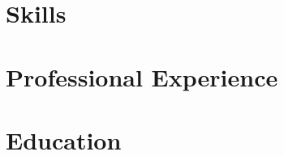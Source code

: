 \documentclass[10pt]{article} %
\begin{document}
\vspace{0.6em}
\section{Skills}


\vspace{0.6em}
\section{Professional Experience}


\vspace{0.25em}

\vspace{0.25em}


\vspace{0.6em}
\section{Education}

\end{document}
